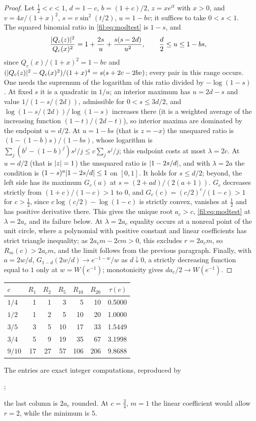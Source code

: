\begin{proof}
Let $\tfrac12<c<1$, $d=1-c$, $b=(1+c)/2$, $z=xe^{it}$ with $x>0$, and $v=4x/(1+x)^2$, $s=v\sin^2(t/2)$,
$u=1-bv$; it suffices to take $0<s<1$. The squared binomial ratio in \eqref{fil:eq:modtest} is $1-s$, and
\[
 \frac{\lvert Q_c(z)\rvert^2}{Q_c(x)^2}=1+\frac{2s}u+\frac{s(s-2d)}{u^2},\qquad \frac d2\le u\le1-bs,
\]
since $Q_c(x)/(1+x)^2=1-bv$ and $(\lvert Q_c(z)\rvert^2-Q_c(x)^2)/(1+x)^4=s(s+2c-2bv)$; every pair in this range occurs.
One needs the supremum of the logarithm of this ratio divided by $-\log(1-s)$. At fixed $s$ it is a quadratic
in $1/u$; an interior maximum has $u=2d-s$ and value $1/(1-s/(2d))$, admissible for $0<s\le3d/2$, and
$\log(1-s/(2d))/\log(1-s)$ increases there (it is a weighted average of the increasing function
$(1-t)/(2d-t)$), so interior maxima are dominated by the endpoint $u=d/2$. At $u=1-bs$ (that is $z=-x$) the
unsquared ratio is $(1-(1-b)s)/(1-bs)$, whose logarithm is $\sum_j(b^j-(1-b)^j)s^j/j\le c\sum_js^j/j$; this
endpoint costs at most $\lambda=2c$. At $u=d/2$ (that is $\lvert z\rvert=1$) the unsquared ratio is $\lvert1-2s/d\rvert$, and
with $\lambda=2a$ the condition is $(1-s)^a\lvert1-2s/d\rvert\le1$ on $[0,1]$. It holds for $s\le d/2$; beyond, the
left side has its maximum $G_c(a)$ at $s=(2+ad)/(2(a+1))$. $G_c$ decreases strictly from $(1+c)/(1-c)>1$ to
$0$, and $G_c(c)=(c/2)^c/(1-c)>1$ for $c>\tfrac12$, since $c\log(c/2)-\log(1-c)$ is strictly convex, vanishes
at $\tfrac12$ and has positive derivative there. This gives the unique root $a_c>c$, \eqref{fil:eq:modtest} at
$\lambda=2a_c$ and its failure below. At $\lambda=2a_c$ equality occurs at a nonreal point of the unit circle,
where a polynomial with positive constant and linear coefficients has strict triangle inequality; as
$2a_cm-2cm>0$, this excludes $r=2a_cm$, so $R_m(c)>2a_cm$, and the limit follows from the previous paragraph.
Finally, with $a=2w/d$, $G_{1-d}(2w/d)\to e^{-1-w}/w$ as $d\downarrow0$, a strictly decreasing function equal to
$1$ only at $w=W(e^{-1})$; monotonicity gives $da_c/2\to W(e^{-1})$.
\end{proof}

\begin{center}
\small
\begin{tabular}{@{}lrrrrrr@{}}
\toprule
$c$ & $R_1$ & $R_2$ & $R_5$ & $R_{10}$ & $R_{20}$ & $\tau(c)$\\
\midrule
$1/4$ & 1 & 1 & 3 & 5 & 10 & 0.5000\\
$1/2$ & 1 & 2 & 5 & 10 & 20 & 1.0000\\
$3/5$ & 3 & 5 & 10 & 17 & 33 & 1.5449\\
$3/4$ & 5 & 9 & 19 & 35 & 67 & 3.1998\\
$9/10$ & 17 & 27 & 57 & 106 & 206 & 9.8688\\
\bottomrule
\end{tabular}
\end{center}
The entries are exact integer computations, reproduced by
\begin{center};\end{center}
the last column is $2a_c$ rounded. At $c=\tfrac34$, $m=1$ the linear coefficient would allow $r=2$, while the minimum is $5$.

